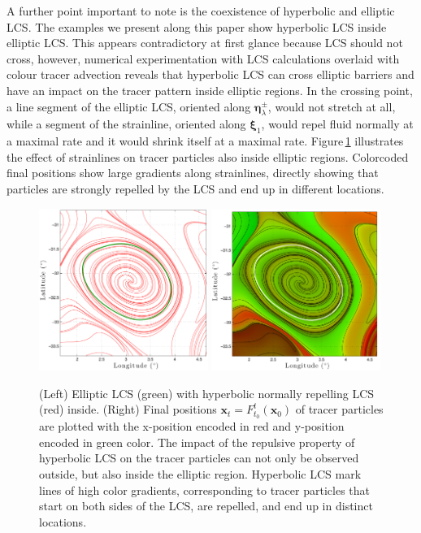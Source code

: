 \documentclass{article}
\begin{document}
A further point important to note is the coexistence of hyperbolic and elliptic LCS. 
The examples we present along this paper show hyperbolic LCS inside elliptic LCS. This appears contradictory at first glance because LCS should not cross, however, numerical experimentation with LCS calculations overlaid with colour tracer advection reveals that hyperbolic LCS can cross elliptic barriers and have an impact on the tracer pattern inside elliptic regions.
In the crossing point, a line segment of the elliptic LCS, oriented along $\boldsymbol \eta_\lambda^{\pm}$, would not stretch at all, while a segment of the strainline, oriented along $\boldsymbol \xi_1$, would repel fluid normally at a maximal rate and it would shrink itself at a maximal rate.
Figure\,\ref{fig:ocean_dataset_colortracer} illustrates the effect of strainlines on tracer particles also inside elliptic regions. Colorcoded final positions show large gradients along strainlines, directly showing that particles are strongly repelled by the LCS and end up in different locations.  


\begin{figure}[hbt]
\centering
\includegraphics[width=0.49\textwidth]{graphics/ocean_dataset/LCS_fwd_coherent_eddy}
\includegraphics[width=0.49\textwidth]{graphics/ocean_dataset/LCS_fwd_colortracer}
\caption{(Left) Elliptic LCS (green) with hyperbolic normally repelling LCS (red) inside. (Right) Final positions $\boldsymbol x_t = F_{t_0}^t(\boldsymbol x_0)$ of tracer particles are plotted with the x-position encoded in red and y-position encoded in green color. The impact of the repulsive property of hyperbolic LCS on the tracer particles can not only be observed outside, but also inside the elliptic region. Hyperbolic LCS mark lines of high color gradients, corresponding to tracer particles that start on both sides of the LCS, are repelled, and end up in distinct locations.}
\label{fig:ocean_dataset_colortracer}
\end{figure}
\end{document}
